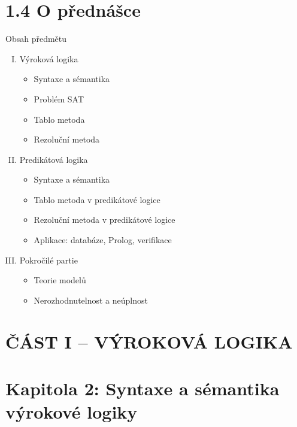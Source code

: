 \documentclass{beamer}
\begin{document}
\section{1.4 O přednášce}


\begin{frame}{Obsah předmětu}

    \begin{enumerate}[I.]
        \item Výroková logika
        \begin{itemize}
            \item Syntaxe a sémantika
            \item Problém SAT
            \item Tablo metoda
            \item Rezoluční metoda
        \end{itemize}
        \item Predikátová logika
        \begin{itemize}
            \item Syntaxe a sémantika
            \item Tablo metoda v predikátové logice
            \item Rezoluční metoda v predikátové logice
            \item Aplikace: databáze, Prolog, verifikace
        \end{itemize}
        \item Pokročilé partie
        \begin{itemize}
            \item Teorie modelů
            \item Nerozhodnutelnost a neúplnost
        \end{itemize}
    \end{enumerate}    

\end{frame}


\section{ČÁST I -- VÝROKOVÁ LOGIKA}


\section{\sc Kapitola 2: Syntaxe a sémantika výrokové logiky}
\end{document}
